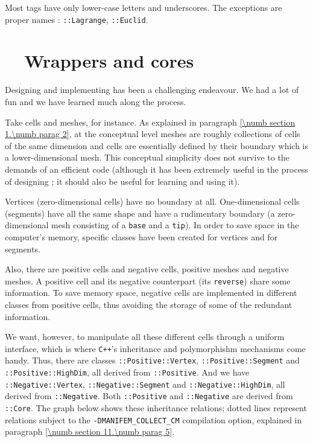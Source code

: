 Most tags have only lower-case letters and underscores.
The exceptions are proper names : {\small\tt {}::Lagrange}, {\small\tt {}::Euclid}.


\section{~~Wrappers and cores}\label{\numb section 11.\numb parag 4}

Designing and implementing {\maniFEM} has been a challenging endeavour.
We had a lot of fun and we have learned much along the process.

Take cells and meshes, for instance.
As explained in paragraph \ref{\numb section 1.\numb parag 2}, at the conceptual level meshes
are roughly collections of cells of the same dimension and cells are essentially
defined by their boundary which is a lower-dimensional mesh.
This conceptual simplicity does not survive to the demands of an efficient code
(although it has been extremely useful in the process of designing \maniFEM;
it should also be useful for learning and using it).

Vertices (zero-dimensional cells) have no boundary at all.
One-dimensional cells (segments) have all the same shape and have a rudimentary boundary
(a zero-dimensional mesh consisting of a {\small\tt base} and a {\small\tt tip}).
In order to save space in the computer's memory, specific classes have been created for
vertices and for segments.

Also, there are positive cells and negative cells, positive meshes and negative meshes.
A positive cell and its negative counterpart (its {\small\tt reverse}) share some information.
To save memory space, negative cells are implemented in different classes from
positive cells, thus avoiding the storage of some of the redundant information.

We want, however, to manipulate all these different cells through a uniform interface,
which is where {\tt C++}'s inheritance and polymorphishm mechanisms come handy.
Thus, there are classes {\small\tt{}::Positive::Vertex},
{\small\tt{}::Positive::Segment} and {\small\tt{}::Positive::HighDim},
all derived from {\small\tt{}::Positive}.
And we have {\small\tt{}::Negative::Vertex},
{\small\tt{}::Negative::Segment} and {\small\tt{}::Negative::HighDim},
all derived from {\small\tt{}::Negative}.
Both {\small\tt{}::Positive} and {\small\tt{}::Negative} are derived from
{\small\tt{}::Core}.
The graph below shows these inheritance relations; dotted lines represent relations subject to
the {\small\tt -DMANIFEM\_COLLECT\_CM} compilation option, explained in paragraph
\ref{\numb section 11.\numb parag 5}.

